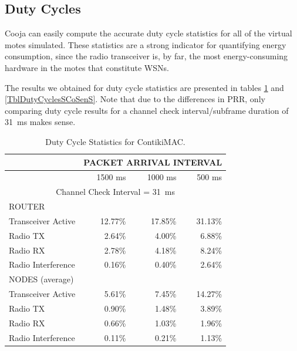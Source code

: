 \documentclass[12pt,a4paper]{article}
\begin{document}
\subsection{Duty Cycles}

Cooja can easily compute the accurate duty cycle statistics for all of
the virtual motes simulated. These statistics are a strong indicator for
quantifying energy consumption, since the radio transceiver is, by far,
the most energy-consuming hardware in the motes that constitute WSNs.

The results we obtained for duty cycle statistics are presented in tables
\ref{TblDutyCyclesContikiMAC} and \ref{TblDutyCyclesSCoSenS}. Note that
due to the differences in PRR, only comparing duty cycle results for
a channel check interval/subframe duration of 31~ms makes sense.

\begin{table}[tbph]
\centering
\begin{tabular}{|l|r|r|r|}
\hline
 & \multicolumn{3}{|c|}{PACKET ARRIVAL INTERVAL}\\
\hline
 & 1500 ms & 1000 ms & 500 ms \\
\hline

\multicolumn{4}{|c|}{Channel Check Interval = 31~ms}\\
\hline
 ROUTER & \multicolumn{3}{|c|}{ }\\
\hline
Transceiver Active & 12.77\% & 17.85\% & 31.13\% \\
Radio TX           &  2.64\% &  4.00\% &  6.88\% \\
Radio RX           &  2.78\% &  4.18\% &  8.24\% \\
Radio Interference &  0.16\% &  0.40\% &  2.64\% \\
\hline
 NODES (average) & \multicolumn{3}{|c|}{ }\\
\hline
Transceiver Active & 5.61\% & 7.45\% & 14.27\% \\
Radio TX           & 0.90\% & 1.48\% &  3.89\% \\
Radio RX           & 0.66\% & 1.03\% &  1.96\% \\
Radio Interference & 0.11\% & 0.21\% &  1.13\% \\

\hline
\end{tabular}
\caption{Duty Cycle Statistics for ContikiMAC.}
\label{TblDutyCyclesContikiMAC}
\end{table}
\end{document}
